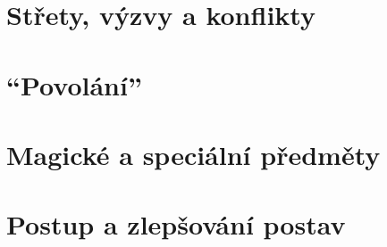 \documentclass[12pt,a4paper,twoside,openany]{book}
\begin{document}
\chapter{Střety, výzvy a konflikty}
\label{chap:jdesenavec}


\chapter{``Povolání''}
\label{chap:speciality}


\chapter{Magické a speciální předměty}
\label{chap:magicke-spec-predmety}



\chapter{Postup a zlepšování postav}
\label{chap:postup}

\end{document}
